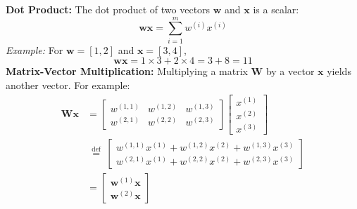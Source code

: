\textbf{Dot Product:}
The dot product of two vectors \( \mathbf{w} \) and \( \mathbf{x} \) is a scalar:
\[ \mathbf{w} \mathbf{x} = \sum_{i=1}^{m} w^{(i)} x^{(i)} \]
\emph{Example:} For \( \mathbf{w} = [1, 2] \) and \( \mathbf{x} = [3, 4] \),
\[ \mathbf{w} \mathbf{x} = 1 \times 3 + 2 \times 4 = 3 + 8 = 11 \]
\textbf{Matrix-Vector Multiplication:}
Multiplying a matrix \( \mathbf{W} \) by a vector \( \mathbf{x} \) yields another vector. For example:
$$
	\begin{aligned}
		\mathbf{W} \mathbf{x} & =\left[\begin{array}{lll}
				                               w^{(1,1)} & w^{(1,2)} & w^{(1,3)} \\
				                               w^{(2,1)} & w^{(2,2)} & w^{(2,3)}
			                               \end{array}\right]\left[\begin{array}{l}
				                                                       x^{(1)} \\
				                                                       x^{(2)} \\
				                                                       x^{(3)}
			                                                       \end{array}\right]                                      \\
		                      & \stackrel{\text { def }}{=}\left[\begin{array}{l}
				                                                         w^{(1,1)} x^{(1)}+w^{(1,2)} x^{(2)}+w^{(1,3)} x^{(3)} \\
				                                                         w^{(2,1)} x^{(1)}+w^{(2,2)} x^{(2)}+w^{(2,3)} x^{(3)}
			                                                         \end{array}\right] \\
		                      & =\left[\begin{array}{l}
				                               \mathbf{w}^{(1)} \mathbf{x} \\
				                               \mathbf{w}^{(2)} \mathbf{x}
			                               \end{array}\right]
	\end{aligned}
$$

